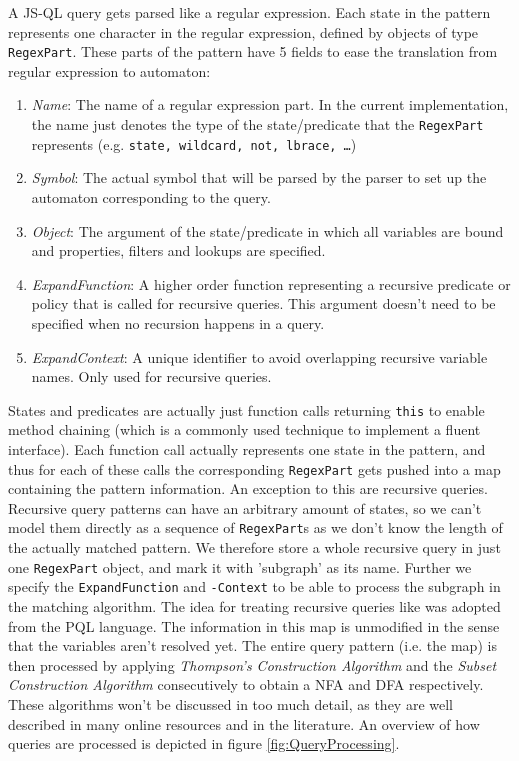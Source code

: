 A JS-QL query gets parsed like a regular expression. Each state in the pattern represents one character in the regular expression, defined by objects of type \texttt{RegexPart}. These parts of the pattern have 5 fields to ease the translation from regular expression to automaton:
\begin{enumerate}
\item \textit{Name}: The name of a regular expression part. In the current implementation, the name just denotes the type of the state/predicate that the \texttt{RegexPart} represents (e.g. \texttt{state, wildcard, not, lbrace, \ldots})
\item \textit{Symbol}: The actual symbol that will be parsed by the parser to set up the automaton corresponding to the query.
\item \textit{Object}: The argument of the state/predicate in which all variables are bound and properties, filters and lookups are specified.
\item \textit{ExpandFunction}: A higher order function representing a recursive predicate or policy that is called for recursive queries. This argument doesn't need to be specified when no recursion happens in a query.
\item \textit{ExpandContext}: A unique identifier to avoid overlapping recursive variable names. Only used for recursive queries.
\end{enumerate}

\noindent States and predicates are actually just function calls returning \texttt{this} to enable method chaining (which is a commonly used technique to implement a fluent interface). Each function call actually represents one state in the pattern, and thus for each of these calls the corresponding \texttt{RegexPart} gets pushed into a map containing the pattern information. 
An exception to this are recursive queries. Recursive query patterns can have an arbitrary amount of states, so we can't model them directly as a sequence of \texttt{RegexPart}s as we don't know the length of the actually matched pattern. We therefore store a whole recursive query in just one \texttt{RegexPart} object, and mark it with 'subgraph' as its name. Further we specify the \texttt{ExpandFunction} and \texttt{-Context} to be able to process the subgraph in the matching algorithm. The idea for treating recursive queries like was adopted from the PQL language\cite{PQL}. The information in this map is unmodified in the sense that the variables aren't resolved yet. The entire query pattern (i.e. the map) is then processed by applying \textit{Thompson's Construction Algorithm} and the \textit{Subset Construction Algorithm} consecutively to obtain a NFA and DFA respectively. These algorithms won't be discussed in too much detail, as they are well described in many online resources and in the literature\cite{Thompson}. An overview of how queries are processed is depicted in figure \ref{fig:QueryProcessing}.

